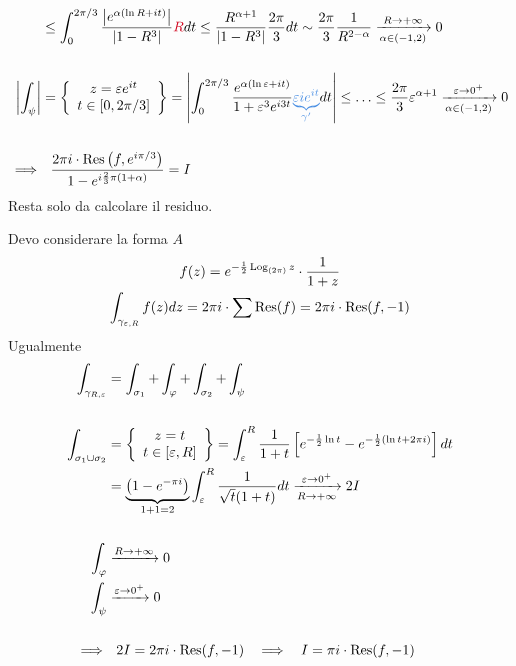 \begin{equation*}
\begin{aligned}
 & \leq \int ^{2\pi /3}_{0}\frac{\left| e^{\alpha (\ln R + it)}\right| }{\left| 1 - R^{3}\right| }\textcolor[rgb]{0.82,0.01,0.11}{R} dt\leq \frac{R^{\alpha + 1}}{\left| 1 - R^{3}\right| }\frac{2\pi }{3} dt\sim \frac{2\pi }{3}\frac{1}{R^{2 - \alpha }}\xrightarrow[\alpha \in (- 1,2)]{R\rightarrow + \infty } 0\\
 & \\
\left| \int _{\psi }\right|  & = \left\{
\begin{array}{ c }
z = \varepsilon e^{it}\\
t\in [ 0,2\pi /3]
\end{array}\right\} = \left| \int ^{2\pi /3}_{0}\frac{e^{\alpha (\ln \varepsilon + it)}}{1 + \varepsilon ^{3} e^{i3t}}\textcolor[rgb]{0.29,0.56,0.89}{\underbrace{\varepsilon ie^{it}}_{\gamma '}} dt\right| \leq \dotsc \leq \frac{2\pi }{3} \varepsilon ^{\alpha + 1}\xrightarrow[\alpha \in (- 1,2)]{\varepsilon \rightarrow 0^{ + }} 0\\
 & \\
\implies  & \ \ \frac{2\pi i\cdot \Res \left(f,e^{i\pi /3}\right)}{1 - e^{i\frac{2}{3} \pi (1 + \alpha)}} = I
\end{aligned}
\end{equation*}
Resta solo da calcolare il residuo.
\Soluzione

Devo considerare la forma $A$
\begin{gather*}
f(z) = e^{ - \frac{1}{2}\operatorname{Log}_{(2\pi)} z} \cdot \frac{1}{1 + z}\\
\int _{\gamma _{\varepsilon ,R}} f(z) dz = 2\pi i\cdot \sum \operatorname{Res} (f) = 2\pi i\cdot \operatorname{Res} (f, - 1)
\end{gather*}
Ugualmente
\begin{equation*}
\begin{aligned}
\int _{\gamma _{R,\varepsilon }} & = \int _{\sigma _{1}} + \int _{\varphi } + \int _{\sigma _{2}} + \int _{\psi }\\
 & \\
\int _{\sigma _{1} \cup \sigma _{2}} & = \left\{
\begin{array}{ c }
z = t\\
t\in [ \varepsilon ,R]
\end{array}\right\} = \int ^{R}_{\varepsilon }\frac{1}{1 + t}\left[ e^{ - \frac{1}{2}\ln t} - e^{ - \frac{1}{2}(\ln t + 2\pi i)}\right] dt\\
 & = \underbrace{\left(1 - e^{ - \pi i}\right)}_{1 + 1 = 2}\int ^{R}_{\varepsilon }\frac{1}{\sqrt{t}(1 + t)} dt\xrightarrow[R\rightarrow + \infty ]{\varepsilon \rightarrow 0^{ + }} 2I\\
 & \\
\int _{\varphi } & \xrightarrow{R\rightarrow + \infty } 0\\
\int _{\psi } & \xrightarrow{\varepsilon \rightarrow 0^{ + }} 0\\
 & \\
\implies  & \ \ 2I = 2\pi i\cdot \operatorname{Res} (f, - 1) \ \ \implies \ \ I = \pi i\cdot \operatorname{Res} (f, - 1)
\end{aligned}
\end{equation*}
\Soluzione

